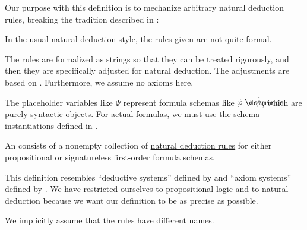 \begin{comments}
  \item Our purpose with this definition is to mechanize arbitrary natural deduction rules, breaking the tradition described in \cite[13]{MartinLöf1984IntuitionisticTypeTheory}:
  \begin{displayquote}
    In the usual natural deduction style, the rules given are not quite formal.
  \end{displayquote}

  The rules are formalized as strings so that they can be treated rigorously, and then they are specifically adjusted for natural deduction. The adjustments are based on \cite[sec. 2.1]{TroelstraSchwichtenberg2000BasicProofTheory}. Furthermore, we assume no axioms here.

  \item The placeholder variables like \( \Psi \) represent formula schemas like \( \syn\varphi \synimplies \syn\psi \), which are purely syntactic objects. For actual formulas, we must use the schema instantiations defined in .
\end{comments}

\begin{definition}\label{def:abstract_natural_deduction_system}\mimprovised
  An  consists of a nonempty collection of \hyperref[def:natural_deduction_rule]{natural deduction rules} for either propositional or signatureless first-order formula schemas.
\end{definition}
\begin{comments}
  \item This definition resembles \enquote{deductive systems} defined by  and \enquote{axiom systems} defined by . We have restricted ourselves to propositional logic and to natural deduction because we want our definition to be as precise as possible.
  \item We implicitly assume that the rules have different names.
\end{comments}

